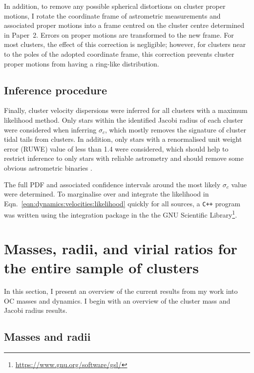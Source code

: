 In addition, to remove any possible spherical distortions on cluster proper motions, I rotate the coordinate frame of astrometric measurements and associated proper motions into a frame centred on the cluster centre determined in Paper~2. Errors on proper motions are transformed to the new frame. For most clusters, the effect of this correction is negligible; however, for clusters near to the poles of the adopted coordinate frame, this correction prevents cluster proper motions from having a ring-like distribution.

\subsection{Inference procedure}
\label{sec:dynamics:velocities:inference}

Finally, cluster velocity dispersions were inferred for all clusters with a maximum likelihood method. Only stars within the identified Jacobi radius of each cluster were considered when inferring $\sigma_c$, which mostly removes the signature of cluster tidal tails from clusters. In addition, only stars with a renormalised unit weight error (RUWE) value of less than 1.4 were considered, which should help to restrict inference to only stars with reliable astrometry and should remove some obvious astrometric binaries \citep{lindegren_gaia_2021,penoyre_astrometric_2022,penoyre_astrometric_2022-1}.

The full PDF and associated confidence intervals around the most likely $\sigma_c$ value were determined. To marginalise over and integrate the likelihood in Eqn.~\ref{eqn:dynamics:velocities:likelihood} quickly for all sources, a \texttt{C++} program was written using the integration package in the the GNU Scientific Library\footnote{\url{https://www.gnu.org/software/gsl/}}.


\section{Masses, radii, and virial ratios for the entire sample of clusters}
\label{sec:dynamics:results}

In this section, I present an overview of the current results from my work into OC masses and dynamics. I begin with an overview of the cluster mass and Jacobi radius results.


\subsection{Masses and radii}
\label{sec:dynamics:results:masses}

